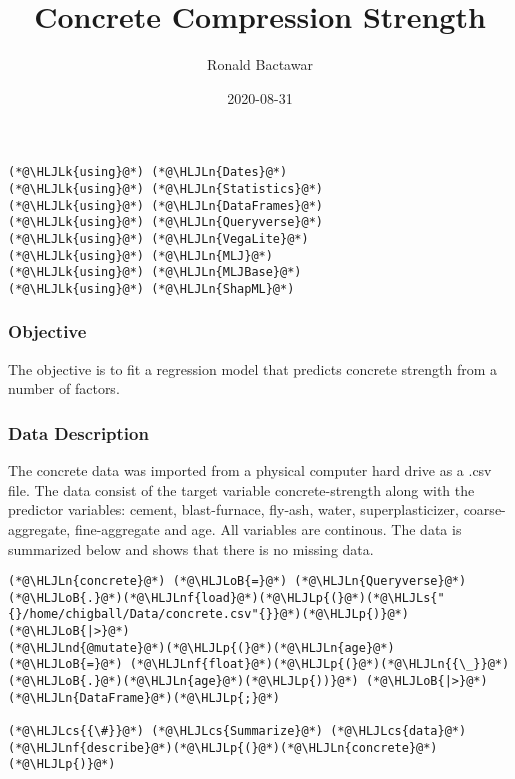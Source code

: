 \documentclass[12pt,a4paper]{article}
\title{ Concrete Compression Strength }
\author{ Ronald Bactawar }
\date{ 2020-08-31 }
\newcommand{\HLJLk}[1]{\textcolor[RGB]{148,91,176}{\textbf{#1}}}
\newcommand{\HLJLn}[1]{#1}
\newcommand{\HLJLnd}[1]{\textcolor[RGB]{214,102,97}{#1}}
\newcommand{\HLJLnf}[1]{\textcolor[RGB]{66,102,213}{#1}}
\newcommand{\HLJLs}[1]{\textcolor[RGB]{201,61,57}{#1}}
\newcommand{\HLJLoB}[1]{\textcolor[RGB]{102,102,102}{\textbf{#1}}}
\newcommand{\HLJLp}[1]{#1}
\newcommand{\HLJLcs}[1]{\textcolor[RGB]{153,153,119}{\textit{#1}}}
\begin{document}
\maketitle

\begin{lstlisting}
(*@\HLJLk{using}@*) (*@\HLJLn{Dates}@*)
(*@\HLJLk{using}@*) (*@\HLJLn{Statistics}@*)
(*@\HLJLk{using}@*) (*@\HLJLn{DataFrames}@*)
(*@\HLJLk{using}@*) (*@\HLJLn{Queryverse}@*)
(*@\HLJLk{using}@*) (*@\HLJLn{VegaLite}@*)
(*@\HLJLk{using}@*) (*@\HLJLn{MLJ}@*)
(*@\HLJLk{using}@*) (*@\HLJLn{MLJBase}@*)
(*@\HLJLk{using}@*) (*@\HLJLn{ShapML}@*)
\end{lstlisting}


\subsubsection{Objective}
The objective is to fit a regression model that predicts concrete strength from a number of factors.

\subsubsection{Data Description}
The concrete data was imported from a physical computer hard drive as a .csv file.  The data consist of the target variable concrete-strength along with the predictor variables: cement, blast-furnace, fly-ash, water, superplasticizer, coarse-aggregate, fine-aggregate and age. All variables are continous. The data is summarized below and shows that there is no missing data. 


\begin{lstlisting}
(*@\HLJLn{concrete}@*) (*@\HLJLoB{=}@*) (*@\HLJLn{Queryverse}@*)(*@\HLJLoB{.}@*)(*@\HLJLnf{load}@*)(*@\HLJLp{(}@*)(*@\HLJLs{"{}/home/chigball/Data/concrete.csv"{}}@*)(*@\HLJLp{)}@*) (*@\HLJLoB{|>}@*)
(*@\HLJLnd{@mutate}@*)(*@\HLJLp{(}@*)(*@\HLJLn{age}@*) (*@\HLJLoB{=}@*) (*@\HLJLnf{float}@*)(*@\HLJLp{(}@*)(*@\HLJLn{{\_}}@*)(*@\HLJLoB{.}@*)(*@\HLJLn{age}@*)(*@\HLJLp{))}@*) (*@\HLJLoB{|>}@*)(*@\HLJLn{DataFrame}@*)(*@\HLJLp{;}@*)

(*@\HLJLcs{{\#}}@*) (*@\HLJLcs{Summarize}@*) (*@\HLJLcs{data}@*) 
(*@\HLJLnf{describe}@*)(*@\HLJLp{(}@*)(*@\HLJLn{concrete}@*)(*@\HLJLp{)}@*)
\end{lstlisting}
\end{document}

